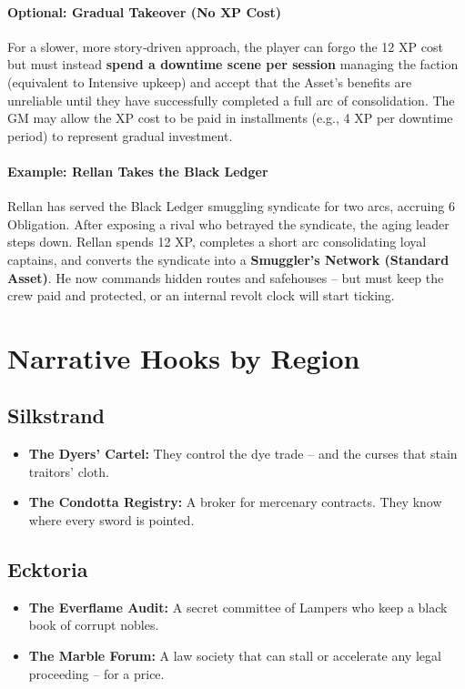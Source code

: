 \begin{tcolorbox}[colback=black!3!white,colframe=black!60!white,title={From Faction to Asset: Taking Over a Terrestrial Patron}]
  \paragraph{Optional: Gradual Takeover (No XP Cost)}
  For a slower, more story‑driven approach, the player can forgo the 12 XP cost but must instead \textbf{spend a downtime scene per session} managing the faction (equivalent to Intensive upkeep) and accept that the Asset’s benefits are unreliable until they have successfully completed a full arc of consolidation. The GM may allow the XP cost to be paid in installments (e.g., 4 XP per downtime period) to represent gradual investment.
  
  \paragraph{Example: Rellan Takes the Black Ledger}
  Rellan has served the Black Ledger smuggling syndicate for two arcs, accruing 6 Obligation. After exposing a rival who betrayed the syndicate, the aging leader steps down. Rellan spends 12 XP, completes a short arc consolidating loyal captains, and converts the syndicate into a \textbf{Smuggler’s Network (Standard Asset)}. He now commands hidden routes and safehouses – but must keep the crew paid and protected, or an internal revolt clock will start ticking.
  \end{tcolorbox}
  
\section{Narrative Hooks by Region}

\subsection*{Silkstrand}
\begin{itemize}
  \item \textbf{The Dyers’ Cartel:} They control the dye trade – and the curses that stain traitors’ cloth.
  \item \textbf{The Condotta Registry:} A broker for mercenary contracts. They know where every sword is pointed.
\end{itemize}

\subsection*{Ecktoria}
\begin{itemize}
  \item \textbf{The Everflame Audit:} A secret committee of Lampers who keep a black book of corrupt nobles.
  \item \textbf{The Marble Forum:} A law society that can stall or accelerate any legal proceeding – for a price.
\end{itemize}

